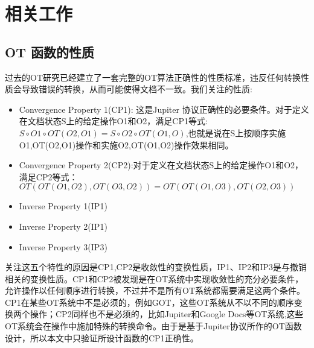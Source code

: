 \chapter{相关工作}
\label{chapter:related_work}
\section{OT 函数的性质}
	过去的OT研究已经建立了一套完整的OT算法正确性的性质标准\cite{sun2014exhaustive}，违反任何转换性质会导致错误的转换，从而可能使得文档不一致。我们关注的性质:
	\begin{itemize}
	  \item Convergence Property 1(CP1): 这是Jupiter 协议正确性的必要条件。对于定义在文档状态S上的给定操作O1和O2，满足CP1等式:$S \circ O1 \circ OT(O2,O1) = S \circ O2 \circ OT(O1,O)$,也就是说在S上按顺序实施O1,OT(O2,O1)操作和实施O2,OT(O1,O2)操作效果相同。
	  \item Convergence Property 2(CP2):对于定义在文档状态S上的给定操作O1和O2，满足CP2等式：$OT(OT(O1,O2),OT(O3,O2)) = OT(OT(O1,O3),OT(O2,O3))$
	  \item Inverse Property 1(IP1)
	  \item Inverse Property 2(IP1)
	  \item Inverse Property 3(IP3)
	\end{itemize}
	关注这五个特性的原因是CP1,CP2是收敛性的变换性质，IP1、IP2和IP3是与撤销相关的变换性质。CP1和CP2被发现是在OT系统中实现收敛性的充分必要条件，允许操作以任何顺序进行转换，不过并不是所有OT系统都需要满足这两个条件。CP1在某些OT系统中不是必须的，例如GOT\cite{sun1998achieving}，这些OT系统从不以不同的顺序变换两个操作；CP2同样也不是必须的，比如Jupiter和Google Docs等OT系统,这些OT系统会在操作中施加特殊的转换命令。由于是基于Jupiter协议所作的OT函数设计，所以本文中只验证所设计函数的CP1正确性。
	
